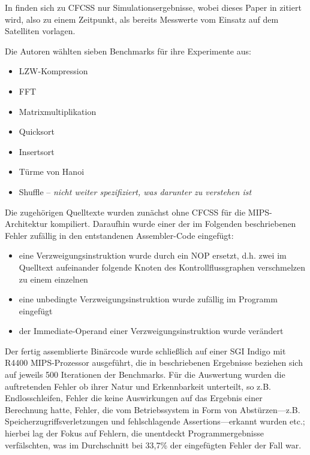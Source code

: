 \documentclass[11pt]{article}
\begin{document}
In \cite{oh-2002-control} finden sich zu CFCSS nur Simulationsergebnisse, wobei
dieses Paper in \cite{argos-2002-lessons} zitiert wird, also zu einem
Zeitpunkt, als bereits Messwerte vom Einsatz auf dem Satelliten vorlagen.

Die Autoren wählten sieben Benchmarks für ihre Experimente aus:

\begin{itemize}
  \item LZW-Kompression
  \item FFT
  \item Matrixmultiplikation
  \item Quicksort
  \item Insertsort
  \item Türme von Hanoi
  \item Shuffle – \emph{nicht weiter spezifiziert, was darunter zu verstehen ist}
\end{itemize}

Die zugehörigen Quelltexte wurden zunächst ohne CFCSS für die MIPS-Architektur
kompiliert. Daraufhin wurde einer der im Folgenden beschriebenen Fehler
zufällig in den entstandenen Assembler-Code eingefügt:

\begin{itemize}
  \item eine Verzweigungsinstruktion wurde durch ein NOP ersetzt,
        d.h. zwei im Quelltext aufeinander folgende Knoten des Kontrollflussgraphen
        verschmelzen zu einem einzelnen
  \item eine unbedingte Verzweigungsinstruktion wurde zufällig im Programm eingefügt
  \item der Immediate-Operand einer Verzweigungsinstruktion wurde verändert
\end{itemize}

Der fertig assemblierte Binärcode wurde schließlich auf einer SGI Indigo mit
R4400 MIPS-Prozessor ausgeführt, die in \cite{oh-2002-control} beschriebenen
Ergebnisse beziehen sich auf jeweils 500 Iterationen der Benchmarks. Für die
Auswertung wurden die auftretenden Fehler ob ihrer Natur und Erkennbarkeit
unterteilt, so z.B. Endlosschleifen, Fehler die keine Auswirkungen auf das
Ergebnis einer Berechnung hatte, Fehler, die vom Betriebssystem in Form von
Abstürzen—z.B. Speicherzugriffsverletzungen und fehlschlagende
Assertions—erkannt wurden etc.; hierbei lag der Fokus auf Fehlern, die
unentdeckt Programmergebnisse verfälschten, was im Durchschnitt bei 33,7\% der
eingefügten Fehler der Fall war.
\end{document}
